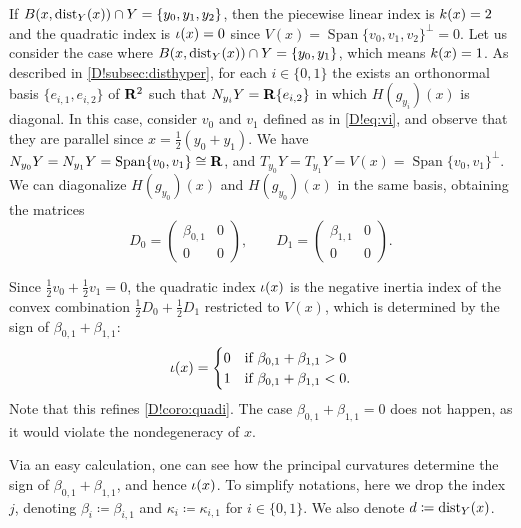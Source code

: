 If $B(x,\operatorname{dist}_Y(x))\cap Y =\{y_0,y_1,y_2\}$, then the piecewise linear index is $k(x)=2$ and the quadratic index is $\iota(x)=0$ since $V(x)= \operatorname{Span} \{v_0,v_1,v_2\}^\perp =0$. Let us consider the case where $B(x,\operatorname{dist}_Y(x))\cap Y =\{y_0,y_1\}$, which means $k(x)=1$. As described in \cref{D!subsec:disthyper}, for each $i\in \{0,1\}$ the exists an orthonormal basis $\{e_{i,1}, e_{i,2}\}$ of $\mathbf{R}^2$ such that $N_{y_i}Y =\mathbf{R} \{e_{i,2}\}$ in which $H(g_{y_i})(x)$ is diagonal. In this case,
consider $v_0$ and $v_1$ defined as in \cref{D!eq:vi}, and observe that they are parallel since $x=\frac{1}{2}(y_0 +y_1)$. We have $N_{y_0}Y =N_{y_1}Y =\operatorname{Span} \{v_0,v_1\}\cong \mathbf{R}$, and $T_{y_0}Y = T_{y_1}Y = V(x) = \operatorname{Span} \{v_0,v_1\}^\perp$. We can diagonalize $H(g_{y_0})(x)$ and $H(g_{y_0})(x)$ in the same basis, 
obtaining the matrices 
\[
  D_0 = \begin{pmatrix}
  \beta_{0,1} & 0 \\
  0 & 0 
  \end{pmatrix}, \qquad
  D_1 = \begin{pmatrix}
  \beta_{1,1} & 0 \\
  0 & 0 
  \end{pmatrix} .
\]

Since $\frac{1}{2}v_0 +\frac{1}{2}v_1 =0$, the quadratic index $\iota (x)$ is the negative inertia index of the convex combination $\frac{1}{2}D_0 +\frac{1}{2}D_1$ restricted to $V(x)$, which is determined by the sign of $\beta_{0,1}+\beta_{1,1}$:
\[
  \iota (x) = \begin{cases}
    0  & \text{if } \beta_{0,1}+\beta_{1,1}>0 \\
    1 & \text{if } \beta_{0,1}+\beta_{1,1}<0 .
  \end{cases}
\]
Note that this refines \cref{D!coro:quadi}. The case $\beta_{0,1}+\beta_{1,1}=0$ does not happen, as it would violate the nondegeneracy of $x$.

Via an easy calculation, one can see how the principal curvatures determine the sign of $\beta_{0,1}+\beta_{1,1}$, and hence $\iota (x)$. To simplify notations, here we drop the index $j$, denoting $\beta_i \coloneq \beta_{i,1}$ and $\kappa_i \coloneq \kappa_{i,1}$ for $i\in \{0,1\}$. We also denote $d\coloneq \operatorname{dist}_Y (x)$. 

